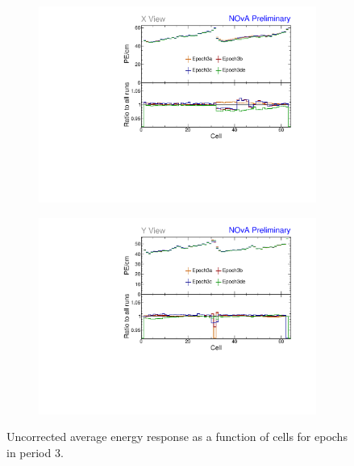 \begin{figure}[!hbtp]
\centering
\begin{subfigure}[b]{0.495\textwidth}
\centering
\includegraphics[width=\textwidth]{PlotsTBCalibTechnote/Attenprofs_P3Data_CellPE_X_Combined.pdf}
\end{subfigure}
\begin{subfigure}[b]{0.495\textwidth}
\centering
\includegraphics[width=\textwidth]{PlotsTBCalibTechnote/Attenprofs_P3Data_CellPE_Y_Combined.pdf}
\end{subfigure}
\caption{Uncorrected average energy response as a function of cells for epochs in period 3.}
\label{fig:CalibhistCellPE_period3}
\end{figure}

